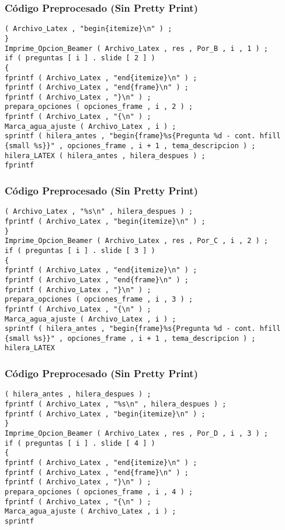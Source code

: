 \documentclass{beamer}
\begin{document}
\begin{frame}[fragile]
\frametitle{C\'odigo Preprocesado (Sin Pretty Print)}
\begin{lstlisting}[style=CStyle]
( Archivo_Latex , "begin{itemize}\n" ) ; 
} 
Imprime_Opcion_Beamer ( Archivo_Latex , res , Por_B , i , 1 ) ; 
if ( preguntas [ i ] . slide [ 2 ] ) 
{ 
fprintf ( Archivo_Latex , "end{itemize}\n" ) ; 
fprintf ( Archivo_Latex , "end{frame}\n" ) ; 
fprintf ( Archivo_Latex , "}\n" ) ; 
prepara_opciones ( opciones_frame , i , 2 ) ; 
fprintf ( Archivo_Latex , "{\n" ) ; 
Marca_agua_ajuste ( Archivo_Latex , i ) ; 
sprintf ( hilera_antes , "begin{frame}%s{Pregunta %d - cont. hfill {small %s}}" , opciones_frame , i + 1 , tema_descripcion ) ; 
hilera_LATEX ( hilera_antes , hilera_despues ) ; 
fprintf \end{lstlisting}
\end{frame}
\begin{frame}[fragile]
\frametitle{C\'odigo Preprocesado (Sin Pretty Print)}
\begin{lstlisting}[style=CStyle]
( Archivo_Latex , "%s\n" , hilera_despues ) ; 
fprintf ( Archivo_Latex , "begin{itemize}\n" ) ; 
} 
Imprime_Opcion_Beamer ( Archivo_Latex , res , Por_C , i , 2 ) ; 
if ( preguntas [ i ] . slide [ 3 ] ) 
{ 
fprintf ( Archivo_Latex , "end{itemize}\n" ) ; 
fprintf ( Archivo_Latex , "end{frame}\n" ) ; 
fprintf ( Archivo_Latex , "}\n" ) ; 
prepara_opciones ( opciones_frame , i , 3 ) ; 
fprintf ( Archivo_Latex , "{\n" ) ; 
Marca_agua_ajuste ( Archivo_Latex , i ) ; 
sprintf ( hilera_antes , "begin{frame}%s{Pregunta %d - cont. hfill {small %s}}" , opciones_frame , i + 1 , tema_descripcion ) ; 
hilera_LATEX \end{lstlisting}
\end{frame}
\begin{frame}[fragile]
\frametitle{C\'odigo Preprocesado (Sin Pretty Print)}
\begin{lstlisting}[style=CStyle]
( hilera_antes , hilera_despues ) ; 
fprintf ( Archivo_Latex , "%s\n" , hilera_despues ) ; 
fprintf ( Archivo_Latex , "begin{itemize}\n" ) ; 
} 
Imprime_Opcion_Beamer ( Archivo_Latex , res , Por_D , i , 3 ) ; 
if ( preguntas [ i ] . slide [ 4 ] ) 
{ 
fprintf ( Archivo_Latex , "end{itemize}\n" ) ; 
fprintf ( Archivo_Latex , "end{frame}\n" ) ; 
fprintf ( Archivo_Latex , "}\n" ) ; 
prepara_opciones ( opciones_frame , i , 4 ) ; 
fprintf ( Archivo_Latex , "{\n" ) ; 
Marca_agua_ajuste ( Archivo_Latex , i ) ; 
sprintf \end{lstlisting}
\end{frame}
\end{document}
